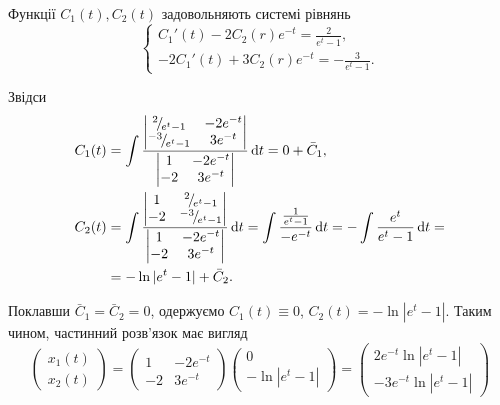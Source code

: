 \begin{solution}
	Функції $C_1(t), C_2(t)$ задовольняють системі рівнянь
	\begin{equation*}
		\left\{
			\begin{aligned}
				C_1'(t) - 2 C_2(r) e^{-t} = \frac{2}{e^t - 1}, \\
				-2 C_1'(t) + 3 C_2(r) e^{-t} = - \frac{3}{e^t - 1}.
			\end{aligned}
		\right.
	\end{equation*}

	Звідси
	\begin{align*}
		C_1(t) &= \int \frac{\begin{vmatrix} \rfrac{2}{e^t - 1} & - 2 e^{-t} \\ \rfrac{-3}{e^t - 1} & 3 e^{-t} \end{vmatrix}}{\begin{vmatrix} 1 & - 2 e^{-t} \\ -2 & 3 e^{-t} \end{vmatrix}} \diff t = 0 + \bar C_1, \\
		C_2(t) &= \int \frac{\begin{vmatrix} 1 & \rfrac{2}{e^t - 1} \\ - 2 & \rfrac{-3}{e^t - 1} \end{vmatrix}}{\begin{vmatrix} 1 & - 2 e^{-t} \\ -2 & 3 e^{-t} \end{vmatrix}} \diff t =\int \frac{\frac{1}{e^t - 1}}{- e^{-t}} \diff t = - \int \frac{e^t}{e^t - 1} \diff t = \\
		&= - \ln |e^t - 1| + \bar C_2.
	\end{align*}

	Поклавши $\bar C_1 = \bar C_2 = 0$, одержуємо $C_1(t) \equiv 0$, $C_2(t) = - \ln |e^t - 1|$. Таким чином, частинний розв'язок має вигляд
	\begin{equation*}
		\begin{pmatrix} x_1(t) \\ x_2(t) \end{pmatrix} = \begin{pmatrix} 1 & -2e^{-t} \\ -2 & 3e^{-t} \end{pmatrix} \begin{pmatrix} 0 \\ - \ln |e^t - 1| \end{pmatrix} = \begin{pmatrix} 2 e^{-t} \ln |e^t - 1| \\ - 3 e^{-t} \ln |e^t - 1| \end{pmatrix}
	\end{equation*}


\end{solution}
